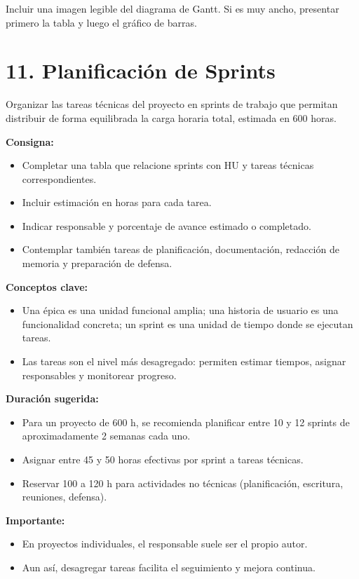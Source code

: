 \documentclass[
11pt, %
]{charter}
\begin{document}
Incluir una imagen legible del diagrama de Gantt. Si es muy ancho, presentar primero la tabla y luego el gráfico de barras.

\section{11. Planificación de Sprints}

Organizar las tareas técnicas del proyecto en sprints de trabajo que permitan distribuir de forma equilibrada la carga horaria total, estimada en 600 horas.

\textbf{Consigna:}
\begin{itemize}
  \item Completar una tabla que relacione sprints con HU y tareas técnicas correspondientes.
  \item Incluir estimación en horas para cada tarea.
  \item Indicar responsable y porcentaje de avance estimado o completado.
  \item Contemplar también tareas de planificación, documentación, redacción de memoria y preparación de defensa.
\end{itemize}

\textbf{Conceptos clave:}
\begin{itemize}
  \item Una \'{e}pica es una unidad funcional amplia; una historia de usuario es una funcionalidad concreta; un sprint es una unidad de tiempo donde se ejecutan tareas.
  \item Las tareas son el nivel más desagregado: permiten estimar tiempos, asignar responsables y monitorear progreso.
\end{itemize}

\textbf{Duración sugerida:}
\begin{itemize}
  \item Para un proyecto de 600 h, se recomienda planificar entre 10 y 12 sprints de aproximadamente 2 semanas cada uno.
  \item Asignar entre 45 y 50 horas efectivas por sprint a tareas técnicas.
  \item Reservar 100 a 120 h para actividades no técnicas (planificación, escritura, reuniones, defensa).
\end{itemize}

\textbf{Importante:}
\begin{itemize}
  \item En proyectos individuales, el responsable suele ser el propio autor.
  \item Aun así, desagregar tareas facilita el seguimiento y mejora continua.
\end{itemize}
\end{document}

